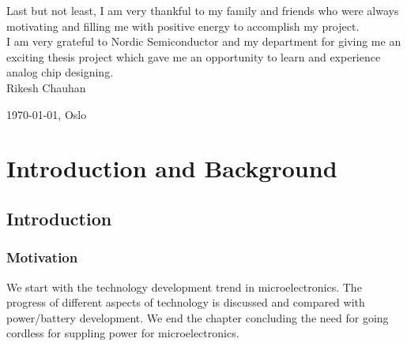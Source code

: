 \documentclass[UKenglish]{ifimaster}  %
\begin{document}
Last but not least, I am very thankful to my family and friends who were always motivating and filling me with positive energy to accomplish my project.  \\

I am very grateful to Nordic Semiconductor and my department for giving me an exciting thesis project which gave me an opportunity to learn and experience analog chip designing. \\

Rikesh Chauhan

\today, Oslo

\cleardoublepage
{}
\setcounter{tocdepth}{1}
\tableofcontents{}

\cleardoublepage
{}
{}
\listoffigures{}

\cleardoublepage
{}
{}
\listoftables{}
                  
\mainmatter{}



\part{Introduction and Background}

\chapter{Introduction}

\section{Motivation}

We start with the technology development trend in microelectronics. The progress of different aspects of 
technology is discussed and compared with power/battery development. We end the chapter concluding the need for
going cordless for suppling power for microelectronics.
\end{document}
